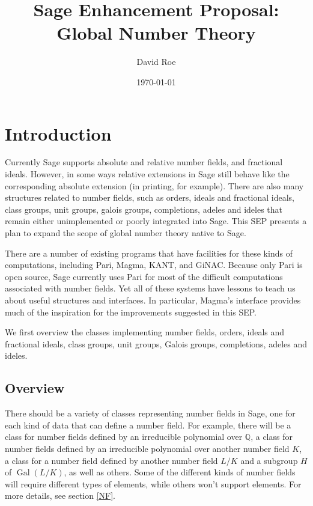 \documentclass[12pt]{article}
\title{Sage Enhancement Proposal: Global Number Theory}
\author{David Roe}
\date{\today}
\providecommand{\Gal}{\operatorname{Gal}}
\begin{document}
\maketitle

\section{Introduction}
Currently Sage supports absolute and relative number fields, and fractional ideals.  However, in some ways relative extensions in Sage still behave like the corresponding absolute extension (in printing, for example).  There are also many structures related to number fields, such as orders, ideals and fractional ideals, class groups, unit groups, galois groups, completions, adeles and ideles that remain either unimplemented or poorly integrated into Sage.  This SEP presents a plan to expand the scope of global number theory native to Sage.

There are a number of existing programs that have facilities for these kinds of computations, including Pari, Magma, KANT, and GiNAC.  Because only Pari is open source,  Sage currently uses Pari for most of the difficult computations associated with number fields.  Yet all of these systems have lessons to teach us about useful structures and interfaces.  In particular, Magma's interface provides much of the inspiration for the improvements suggested in this SEP.

We first overview the classes implementing number fields, orders, ideals and fractional ideals, class groups, unit groups, Galois groups, completions, adeles and ideles.

\subsection{Overview}

There should be a variety of classes representing number fields in Sage, one for each kind of data that can define a number field.  For example, there will be a class for number fields defined by an irreducible polynomial over $\mathbb{Q}$, a class for number fields defined by an irreducible polynomial over another number field $K$, a class for a number field defined by another number field $L/K$ and a subgroup $H$ of $\Gal(L/K)$, as well as others.  Some of the different kinds of number fields will require different types of elements, while others won't support elements.  For more details, see section \ref{NF}.
\end{document}
